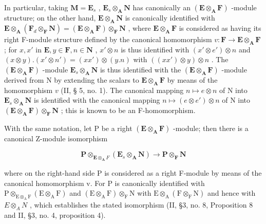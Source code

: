 In particular, taking \(\mathbf{M} = \mathbf{E}_s\) , \(\mathbf{E}_s \otimes_{\mathbf{A}} \mathbf{N}\) has canonically an \((\mathbf{E} \otimes_{\mathbf{A}} \mathbf{F})\) -module structure; on the other hand, \(\mathbf{E} \otimes_{\mathbf{A}} \mathbf{N}\) is canonically identified with \(\mathbf{E} \otimes_{\mathbf{A}} (\mathbf{F}_d \otimes_{\mathbf{F}} \mathbf{N}) = (\mathbf{E} \otimes_{\mathbf{A}} \mathbf{F}) \otimes_{\mathbf{F}} \mathbf{N}\) , where \(\mathbf{E} \otimes_{\mathbf{A}} \mathbf{F}\) is considered as having its right F-module structure defined by the canonical homomorphism \(v: \mathbf{F} \to \mathbf{E} \otimes_{\mathbf{A}} \mathbf{F}\) ; for \(x, x'\) in \(\mathbf{E}, y \in \mathbf{F}, n \in \mathbf{N}\) , \(x' \otimes n\) is thus identified with \((x' \otimes e') \otimes n\) and \((x \otimes y).(x' \otimes n') = (xx') \otimes (y.n)\) with \(((xx') \otimes y) \otimes n\) . The \((\mathbf{E} \otimes_{\mathbf{A}} \mathbf{F})\) -module \(\mathbf{E}_s \otimes_{\mathbf{A}} \mathbf{N}\) is thus identified with the \((\mathbf{E} \otimes_{\mathbf{A}} \mathbf{F})\) -module derived from N by extending the scalars to \(\mathbf{E} \otimes_{\mathbf{A}} \mathbf{F}\) by means of the homomorphism \(v\) (II, § 5, no. 1). The canonical mapping \(n \mapsto e \otimes n\) of N into \(\mathbf{E}_s \otimes_{\mathbf{A}} \mathbf{N}\) is identified with the canonical mapping \(n \mapsto (e \otimes e') \otimes n\) of N into \((\mathbf{E} \otimes_{\mathbf{A}} \mathbf{F}) \otimes_{\mathbf{F}} \mathbf{N}\) ; this is known to be an F-homomorphism.

With the same notation, let P be a right \((\mathbf{E} \otimes_{\mathbf{A}} \mathbf{F})\) -module; then there is a canonical Z-module isomorphism

\[
\mathbf {P} \otimes_ {\mathbf {E} \otimes_ {\mathbf {A}} F} (\mathbf {E} _ {s} \otimes_ {\mathbf {A}} \mathbf {N}) \rightarrow \mathbf {P} \otimes_ {\mathbf {F}} \mathbf {N}\tag{11}
\]

where on the right-hand side P is considered as a right F-module by means of the canonical homomorphism v. For P is canonically identified with \(\mathrm{P}\otimes_{\mathrm{E}\otimes_{\mathrm{A}}\mathrm{F}}(\mathrm{E}\otimes_{\mathrm{A}}\mathrm{F})\) and \((\mathrm{E}\otimes_{\mathrm{A}}\mathrm{F})\otimes_{\mathrm{F}}\mathrm{N}\) with \(\mathrm{E}\otimes_{\mathrm{A}}(\mathrm{F}\otimes_{\mathrm{F}}\mathrm{N})\) and hence with \(E\otimes_{A}N\) , which establishes the stated isomorphism (II, §3, no. 8, Proposition 8 and II, §3, no. 4, proposition 4).

